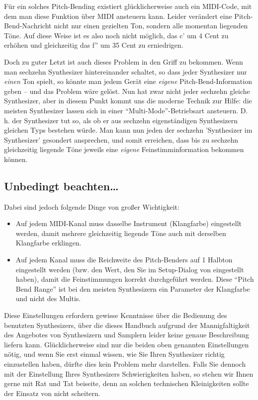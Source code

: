 Für ein solches Pitch-Bending existiert glücklicherweise auch ein
MIDI-Code, mit dem man diese Funktion über MIDI ansteuern kann. Leider
verändert eine Pitch-Bend-Nachricht nicht nur einen gezielten Ton,
sondern alle momentan liegenden Töne. Auf diese Weise ist es also noch
nicht möglich, das c' um 4 Cent zu erhöhen und gleichzeitig das f'' um
35 Cent zu erniedrigen.

Doch zu guter Letzt ist auch dieses Problem in den Griff zu bekommen.
Wenn man sechzehn Synthesizer
hintereinander schaltet, so dass jeder Synthesizer nur \emph{einen} Ton
spielt, so könnte man jedem Gerät eine \emph{eigene} 
Pitch-Bend-Information geben --
und das Problem wäre gelöst. Nun hat zwar nicht
jeder sechzehn gleiche Synthesizer, aber in diesem Punkt kommt uns die
moderne Technik zur Hilfe: die meisten Synthesizer lassen sich in
einer "`Multi-Mode"'-Betriebsart ansteuern. D.\,h. der Synthesizer tut
so, als ob er aus sechzehn eigenständigen Synthesizern gleichen Typs
bestehen würde. Man kann nun jeden der sechzehn 'Synthesizer im
Synthesizer' gesondert ansprechen, und somit erreichen, dass bis zu
sechzehn gleichzeitig liegende Töne jeweils eine \emph{eigene}
Feinstimminformation bekommen können.

\subsection{Unbedingt beachten\dots}\label{sec:unbed-beacht}

Dabei sind jedoch folgende Dinge von großer Wichtigkeit:
\label{PITCH}
\begin{itemize}
\item Auf jedem MIDI-Kanal muss dasselbe Instrument (Klangfarbe)
  eingestellt werden, damit mehrere gleichzeitig liegende Töne auch
  mit derselben Klangfarbe erklingen.
\item Auf jedem Kanal muss die Reichweite des Pitch-Benders auf 1
  Halbton eingestellt werden (bzw. den Wert, den Sie im Setup-Dialog
  von \mutabor{} eingestellt haben), damit die Feinstimmungen
  korrekt durchgeführt werden. Diese "`Pitch Bend Range"' ist bei
  den meisten Synthesizern ein Parameter der Klangfarbe und nicht des
  Multis.
\end{itemize}

Diese Einstellungen erfordern gewisse Kenntnisse über die Bedienung
des benutzten Synthesizers, über die dieses Handbuch aufgrund der
Mannigfaltigkeit des Angebotes von Synthesizern und Samplern leider
keine genaue Beschreibung liefern kann. Glücklicherweise sind nur die
beiden oben genannten Einstellungen nötig, und wenn Sie erst einmal
wissen, wie Sie Ihren Synthesizer richtig einzustellen haben, dürfte
dies kein Problem mehr darstellen. Falls Sie dennoch mit der
Einstellung Ihres Synthesizers Schwierigkeiten haben, so stehen wir
Ihnen gerne mit Rat und Tat beiseite, denn an solchen technischen
Kleinigkeiten sollte der Einsatz von \mutabor{} nicht scheitern.

